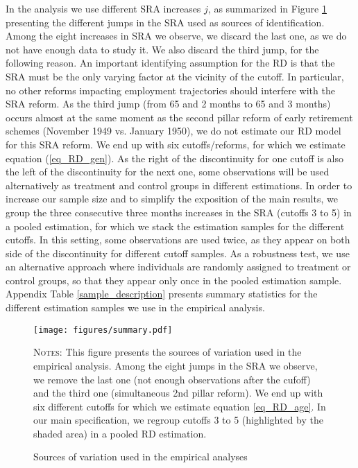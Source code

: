 \documentclass[12pt,a4paper]{article}
\begin{document}
In the analysis we use different SRA increases $j$, as summarized in Figure \ref{rdd_setup} presenting the different jumps in the SRA used as sources of identification. Among the eight increases in SRA we observe, we discard the last one, as we do not have enough data to study it. We also discard the third jump, for the following reason. An important identifying assumption for the RD is that the SRA must be the only varying factor at the vicinity of the cutoff. In particular, no other reforms impacting employment trajectories should interfere with the SRA reform. As the third jump (from 65 and 2 months to 65 and 3 months) occurs almost at the same moment as the second pillar reform of early retirement schemes (November 1949 vs. January 1950), we do not estimate our RD model for this SRA reform.  We end up with six cutoffs/reforms, for which we estimate equation (\ref{eq_RD_gen}).  
As the right of the discontinuity for one cutoff is also the left of the discontinuity for the next one, some observations will be used alternatively as treatment and control groups in different estimations. In order to increase our sample size and to simplify the exposition of the main results, we group the three consecutive three months increases in the SRA (cutoffs 3 to 5) in a pooled estimation, for which we stack the estimation samples for the different cutoffs. In this setting, some observations are used twice, as they appear on both side of the discontinuity for different cutoff samples. As a robustness test, we use an alternative approach where individuals are randomly assigned to treatment or control groups, so that they appear only once in the pooled estimation sample. Appendix Table \ref{sample_description} presents summary statistics for the different estimation samples we use in the empirical analysis. 

\begin{figure}[!t]
	\caption{Sources of variation used in the empirical analyses}
\label{rdd_setup}
	\centering
	\texttt{[image: figures/summary.pdf]}
 	\begin{minipage}{15cm}%
  \footnotesize
	\textsc{Notes:}  This figure presents the sources of variation used in the empirical analysis. Among the eight jumps in the SRA we observe, we remove the last one (not enough observations after the cufoff) and the third one (simultaneous 2nd pillar reform). We end up with six different cutoffs for which we estimate equation \ref{eq_RD_age}. In our main specification, we regroup cutoffs 3 to 5 (highlighted by the shaded area) in a pooled RD estimation. 
	\end{minipage}%
\end{figure}
\end{document}
